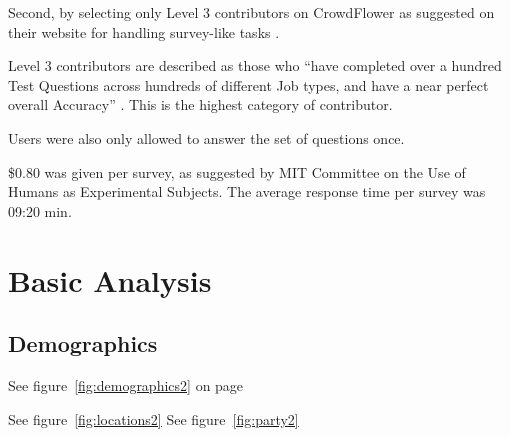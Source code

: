Second, by selecting only Level 3 contributors on CrowdFlower as suggested on their website for handling survey-like tasks \cite{CrowdFlower-guide}.

Level 3 contributors are described as those who ``have completed over a hundred Test Questions across hundreds of different Job types, and have a near perfect overall Accuracy'' \cite{CrowdFlower-levels}. This is the highest category of contributor.
 
Users were also only allowed to answer the set of questions once. 

\$0.80 was given per survey, as suggested by MIT Committee on the Use of Humans as Experimental Subjects. The average response time per survey was 09:20 min.


\section{Basic Analysis}


\subsection{Demographics}



See figure~\ref{fig:demographics2} on page \pageref{fig:demographics2}

See figure~\ref{fig:locations2}
See figure~\ref{fig:party2}




